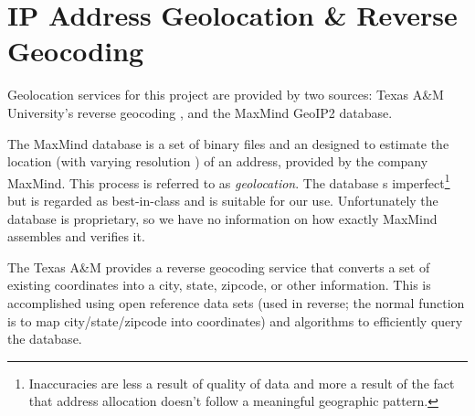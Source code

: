 \section{IP Address Geolocation \& Reverse Geocoding}\label{sec:background_geolocation}

Geolocation services for this project are provided by two sources: Texas A\&M University's reverse geocoding \api, and the MaxMind GeoIP2 database.

The MaxMind database is a set of binary files and an \sdk designed to estimate the location (with varying resolution \cite{MaxmindResolution2020}) of an \ip address, provided by the company MaxMind. This process is referred to as \textit{\ip geolocation}. The database s imperfect\footnote{Inaccuracies are less a result of quality of data and more a result of the fact that \ip address allocation doesn't follow a meaningful geographic pattern.} but is regarded as best-in-class and is suitable for our use. Unfortunately the database is proprietary, so we have no information on how exactly MaxMind assembles and verifies it.

The Texas A\&M \api provides a reverse geocoding service that converts a set of existing coordinates into a city, state, zipcode, or other information. This is accomplished using open reference data sets (used in reverse; the normal function is to map city/state/zipcode into coordinates) and algorithms to efficiently query the database.
